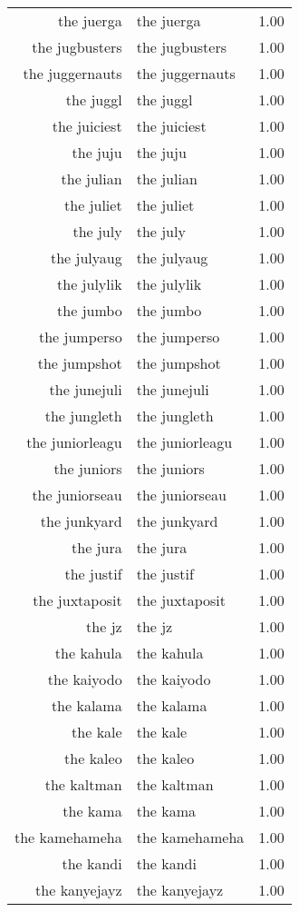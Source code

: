 \begin{table}[ht]
\begin{tabular}{rlr}
  the juerga & the juerga & 1.00 \\ 
  the jugbusters & the jugbusters & 1.00 \\ 
  the juggernauts & the juggernauts & 1.00 \\ 
  the juggl & the juggl & 1.00 \\ 
  the juiciest & the juiciest & 1.00 \\ 
  the juju & the juju & 1.00 \\ 
  the julian & the julian & 1.00 \\ 
  the juliet & the juliet & 1.00 \\ 
  the july & the july & 1.00 \\ 
  the julyaug & the julyaug & 1.00 \\ 
  the julylik & the julylik & 1.00 \\ 
  the jumbo & the jumbo & 1.00 \\ 
  the jumperso & the jumperso & 1.00 \\ 
  the jumpshot & the jumpshot & 1.00 \\ 
  the junejuli & the junejuli & 1.00 \\ 
  the jungleth & the jungleth & 1.00 \\ 
  the juniorleagu & the juniorleagu & 1.00 \\ 
  the juniors & the juniors & 1.00 \\ 
  the juniorseau & the juniorseau & 1.00 \\ 
  the junkyard & the junkyard & 1.00 \\ 
  the jura & the jura & 1.00 \\ 
  the justif & the justif & 1.00 \\ 
  the juxtaposit & the juxtaposit & 1.00 \\ 
  the jz & the jz & 1.00 \\ 
  the kahula & the kahula & 1.00 \\ 
  the kaiyodo & the kaiyodo & 1.00 \\ 
  the kalama & the kalama & 1.00 \\ 
  the kale & the kale & 1.00 \\ 
  the kaleo & the kaleo & 1.00 \\ 
  the kaltman & the kaltman & 1.00 \\ 
  the kama & the kama & 1.00 \\ 
  the kamehameha & the kamehameha & 1.00 \\ 
  the kandi & the kandi & 1.00 \\ 
  the kanyejayz & the kanyejayz & 1.00 \\ 

\end{tabular}
\end{table}
